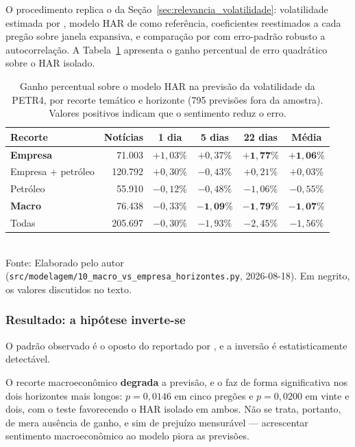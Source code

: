 O procedimento replica o da Seção~\ref{sec:relevancia_volatilidade}: volatilidade estimada por
, modelo HAR de  como referência,
coeficientes reestimados a cada pregão sobre janela expansiva, e comparação por
 com erro-padrão robusto a autocorrelação. A
Tabela~\ref{tab:macro_empresa} apresenta o ganho percentual de erro quadrático sobre o HAR isolado.

\begin{table}[htpb]
\centering
\caption{Ganho percentual sobre o modelo HAR na previsão da volatilidade da PETR4, por recorte temático e horizonte (795 previsões fora da amostra). Valores positivos indicam que o sentimento reduz o erro.}
\label{tab:macro_empresa}
\begin{tabular}{l r c c c c}
\hline
\textbf{Recorte} & \textbf{Notícias} & \textbf{1 dia} & \textbf{5 dias} & \textbf{22 dias} & \textbf{Média} \\ \hline
\textbf{Empresa} & 71.003 & $+1{,}03\%$ & $+0{,}37\%$ & $\mathbf{+1{,}77\%}$ & $\mathbf{+1{,}06\%}$ \\
Empresa + petróleo & 120.792 & $+0{,}30\%$ & $-0{,}43\%$ & $+0{,}21\%$ & $+0{,}03\%$ \\
Petróleo & 55.910 & $-0{,}12\%$ & $-0{,}48\%$ & $-1{,}06\%$ & $-0{,}55\%$ \\
\textbf{Macro} & 76.438 & $-0{,}33\%$ & $\mathbf{-1{,}09\%}$ & $\mathbf{-1{,}79\%}$ & $\mathbf{-1{,}07\%}$ \\
Todas & 205.697 & $-0{,}30\%$ & $-1{,}93\%$ & $-2{,}45\%$ & $-1{,}56\%$ \\
\hline
\end{tabular}
\vspace{0.2cm}
{\small \\ Fonte: Elaborado pelo autor (\texttt{src/modelagem/10\_macro\_vs\_empresa\_horizontes.py}, 2026-08-18). Em negrito, os valores discutidos no texto.}
\end{table}

\subsubsection{Resultado: a hipótese inverte-se}

O padrão observado é o oposto do reportado por , e a inversão é
estatisticamente detectável.

O recorte macroeconômico \textbf{degrada} a previsão, e o faz de forma significativa nos dois
horizontes mais longos: $p = 0{,}0146$ em cinco pregões e $p = 0{,}0200$ em vinte e dois, com o
teste favorecendo o HAR isolado em ambos. Não se trata, portanto, de mera ausência de ganho, e sim
de prejuízo mensurável --- acrescentar sentimento macroeconômico ao modelo piora as previsões.

